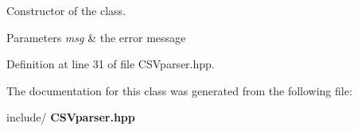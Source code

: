 Constructor of the class. 
\begin{DoxyParams}{Parameters}
{\em msg} & the error message \\
\hline
\end{DoxyParams}


Definition at line 31 of file C\+S\+Vparser.\+hpp.



The documentation for this class was generated from the following file\+:\begin{DoxyCompactItemize}
\item 
include/\textbf{ C\+S\+Vparser.\+hpp}\end{DoxyCompactItemize}
